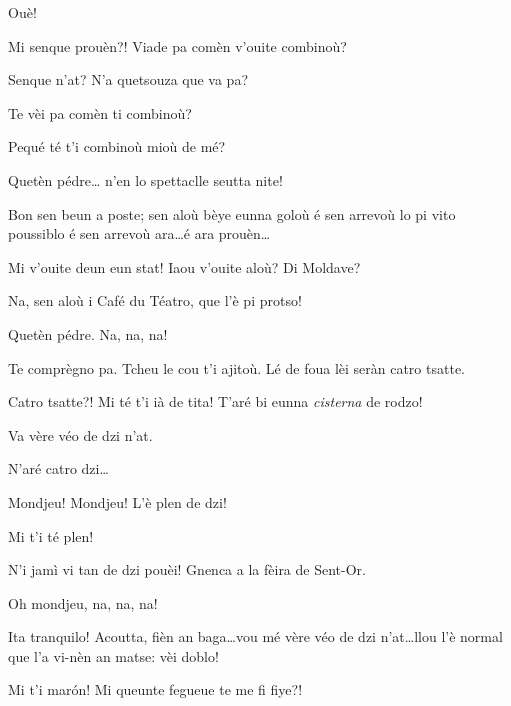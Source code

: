 \begin{drama}
\Joelspeaks Ouè!

\Cimaspeaks Mi senque prouèn?! Viade pa comèn v'ouite combinoù?

\Joelspeaks{} Senque n'at? N'a quetsouza que va pa?

\Cimaspeaks Te vèi pa comèn ti combinoù?

\Joelspeaks{} Pequé té t'i combinoù mioù de mé?

\Cimaspeaks Quetèn pédre\ldots {} n'en lo spettaclle seutta nite!

\Joelspeaks Bon sen beun a poste; sen aloù bèye eunna goloù é sen arrevoù lo pi vito poussiblo é sen arrevoù ara\ldots é ara prouèn\ldots

\Cimaspeaks Mi v'ouite deun eun stat! Iaou v'ouite aloù? Di Moldave?

\Marcospeaks Na, sen aloù i Café du Téatro, que l'è pi protso!

\Cimaspeaks Quetèn pédre. Na, na, na!

\Joelspeaks Te comprègno pa. Tcheu le cou t'i ajitoù. Lé de foua  lèi seràn catro tsatte.

\Cimaspeaks Catro tsatte?! Mi té t'i ià de tita! T'aré bi eunna \textit{cisterna} de rodzo!

\Marcospeaks{} Va vère véo de dzi n'at.

\Joelspeaks{} N'aré catro dzi\ldots


\Joelspeaks{} Mondjeu! Mondjeu! L'è plen de dzi!

\Cimaspeaks{} Mi t'i té plen!

\Joelspeaks N'i jamì vi tan de dzi pouèi! Gnenca a la fèira de Sent-Or.

\Cimaspeaks Oh mondjeu, na, na, na!

\Marcospeaks{} Ita tranquilo! Acoutta, fièn an baga\ldots vou mé vère véo de dzi n'at\ldots llou  l'è normal que l'a vi-nèn an matse: vèi doblo!


\Marcospeaks{} Mi t'i mar\'on! Mi queunte fegueue te me fi fiye?!


\end{drama}
